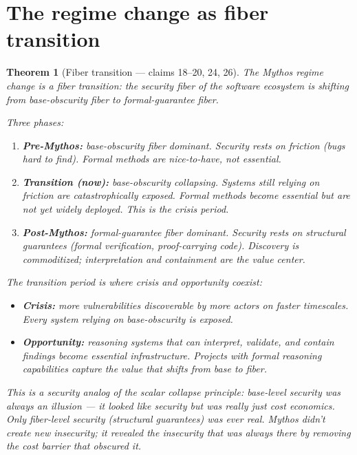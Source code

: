 \documentclass[11pt,a4paper]{article}
\newtheorem{theorem}[definition]{Theorem}
\begin{document}

\section{The regime change as fiber transition}
\label{sec:regime}

\begin{theorem}[Fiber transition --- claims 18--20, 24, 26]
\label{thm:regime}
The Mythos regime change is a fiber transition: the security fiber
of the software ecosystem is shifting from base-obscurity fiber to
formal-guarantee fiber.

Three phases:
\begin{enumerate}
\item \textbf{Pre-Mythos:} base-obscurity fiber dominant. Security
  rests on friction (bugs hard to find). Formal methods are nice-to-have,
  not essential.
\item \textbf{Transition (now):} base-obscurity collapsing. Systems
  still relying on friction are catastrophically exposed. Formal
  methods become essential but are not yet widely deployed. This is
  the crisis period.
\item \textbf{Post-Mythos:} formal-guarantee fiber dominant. Security
  rests on structural guarantees (formal verification, proof-carrying
  code). Discovery is commoditized; interpretation and containment
  are the value center.
\end{enumerate}

The transition period is where crisis and opportunity coexist:
\begin{itemize}
\item \textbf{Crisis:} more vulnerabilities discoverable by more actors
  on faster timescales. Every system relying on base-obscurity is
  exposed.
\item \textbf{Opportunity:} reasoning systems that can interpret,
  validate, and contain findings become essential infrastructure.
  Projects with formal reasoning capabilities capture the value
  that shifts from base to fiber.
\end{itemize}

This is a security analog of the scalar collapse principle: base-level
security was always an illusion --- it looked like security but was
really just cost economics. Only fiber-level security (structural
guarantees) was ever real. Mythos didn't create new insecurity; it
revealed the insecurity that was always there by removing the cost
barrier that obscured it.


\end{theorem}
\end{document}
